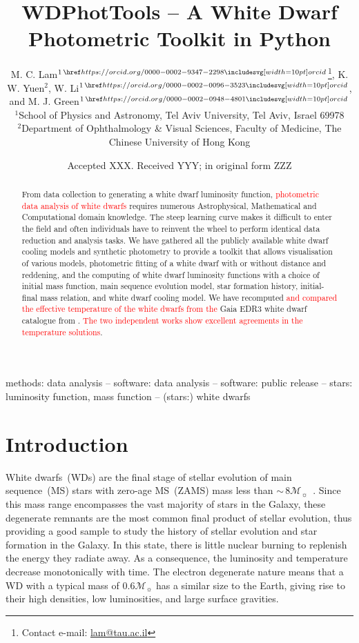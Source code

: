 \documentclass[fleqn,usenatbib]{rasti}
\title[WD Photometric Toolkit]{WDPhotTools -- A White Dwarf Photometric Toolkit in Python}
\author[M. C. Lam et al.]{
M. C. Lam$^{1\,\orcid{0000-0002-9347-2298}}$\thanks{Contact e-mail: \href{mailto:lam@tau.ac.il}{lam@tau.ac.il}},
K. W. Yuen$^{2}$,
W. Li$^{1\,\orcid{0000-0002-0096-3523}}$, and
M. J. Green$^{1\,\orcid{0000-0002-0948-4801}}$\\
$^{1}$School of Physics and Astronomy, Tel Aviv University, Tel Aviv, Israel 69978\\
$^{2}$Department of Ophthalmology \& Visual Sciences, Faculty of Medicine, The Chinese University of Hong Kong
}
\date{Accepted XXX. Received YYY; in original form ZZZ}
\newcommand{\msun}{\mathcal{M}_{\sun}}
\begin{document}
\label{firstpage}
\pagerange{\pageref{firstpage}--\pageref{lastpage}}
\maketitle

\begin{abstract}
From data collection to generating a white dwarf luminosity function,
\textcolor{red}{photometric data analysis of white dwarfs} requires numerous
Astrophysical, Mathematical and
Computational domain knowledge. The steep learning curve makes it difficult to
enter the field and often individuals have to reinvent the wheel to perform
identical data reduction and analysis tasks. We have gathered all the publicly
available white dwarf cooling models and synthetic photometry to provide a
toolkit that allows visualisation of various models, photometric fitting of a
white dwarf with or without distance and reddening, and the computing of white
dwarf luminosity functions with a choice of initial mass function, main
sequence evolution model, star formation history, initial-final mass relation,
and white dwarf cooling model. We have recomputed \textcolor{red}{and compared
the effective temperature of the white
dwarfs from the} Gaia EDR3 white dwarf catalogue from \citet{2021MNRAS.508.3877G}.
\textcolor{red}{The two independent works show excellent agreements in the temperature
solutions}.
\end{abstract}

\begin{keywords}
methods: data analysis -- software: data analysis -- software: public release -- stars: luminosity function, mass function -- (stars:) white dwarfs
\end{keywords}


\section{Introduction}
White dwarfs~(WDs) are the final stage of stellar evolution of main
sequence~(MS) stars with zero-age MS~(ZAMS) mass less than
$\sim$\,$8\msun$~\citep{2013sse..book.....K}. Since this
mass range encompasses the vast majority of stars in the Galaxy, these
degenerate remnants are the most common final product of stellar evolution,
thus providing a good sample to study the history of stellar evolution and star
formation in the Galaxy. In this state, there is little nuclear burning to
replenish the energy they radiate away. As a consequence, the luminosity and
temperature decrease monotonically with time. The electron degenerate nature
means that a WD with a typical mass of $0.6\mathcal{M}_{\sun}$ has a similar
size to the Earth, giving rise to their high densities, low luminosities, and
large surface gravities.
\end{document}
